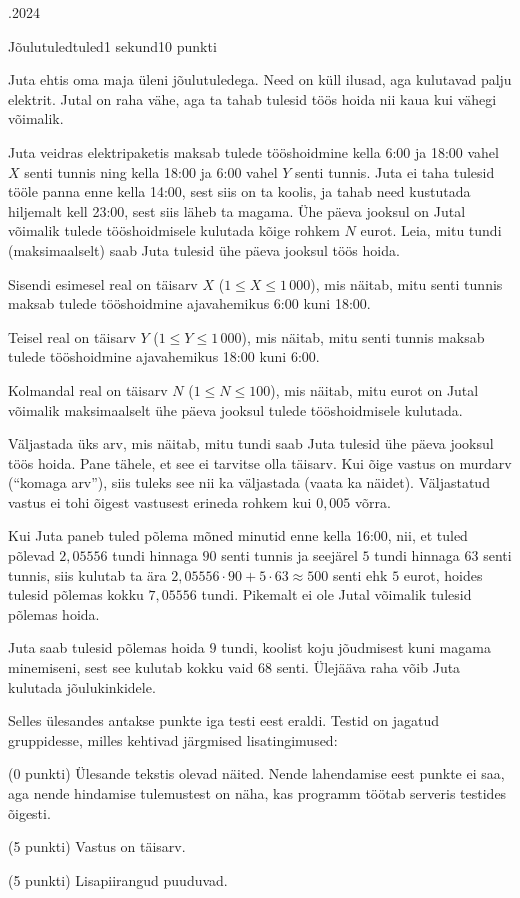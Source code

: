 \documentclass[a4paper,11pt]{article}
\begin{document}
\begin{ol}{\eio}{.2024}{\yle}{}
\begin{yl}{1}{Jõulutuled}{tuled}{1 sekund}{10 punkti}

Juta ehtis oma maja üleni jõulutuledega. Need on küll ilusad, aga kulutavad palju elektrit. Jutal on raha vähe, aga ta tahab tulesid töös hoida nii kaua kui vähegi võimalik.

Juta veidras elektripaketis maksab tulede tööshoidmine kella 6:00 ja 18:00 vahel $X$ senti tunnis ning kella 18:00 ja 6:00 vahel $Y$ senti tunnis. Juta ei taha tulesid tööle panna enne kella 14:00, sest siis on ta koolis, ja tahab need kustutada hiljemalt kell 23:00, sest siis läheb ta magama. Ühe päeva jooksul on Jutal võimalik tulede tööshoidmisele kulutada kõige rohkem $N$ eurot. Leia, mitu tundi (maksimaalselt) saab Juta tulesid ühe päeva jooksul töös hoida.

\sis
Sisendi esimesel real on täisarv $X$ ($1 \le X \le 1\,000$), mis näitab, mitu senti tunnis maksab tulede tööshoidmine ajavahemikus 6:00 kuni 18:00.

Teisel real on täisarv $Y$ ($1 \le Y \le 1\,000$), mis näitab, mitu senti tunnis maksab tulede tööshoidmine ajavahemikus 18:00 kuni 6:00.

Kolmandal real on täisarv $N$ ($1 \le N \le 100$), mis näitab, mitu eurot on Jutal võimalik maksimaalselt ühe päeva jooksul tulede tööshoidmisele kulutada.

\val
Väljastada üks arv, mis näitab, mitu tundi saab Juta tulesid ühe päeva jooksul töös hoida. Pane tähele, et see ei tarvitse olla täisarv. Kui õige vastus on murdarv (``komaga arv''), siis tuleks see nii ka väljastada (vaata ka näidet). Väljastatud vastus ei tohi õigest vastusest erineda rohkem kui $0,005$ võrra.

\nde[0]{3cm}{3cm}

Kui Juta paneb tuled põlema mõned minutid enne kella 16:00, nii, et tuled põlevad $2,05556$ tundi hinnaga $90$ senti tunnis ja seejärel $5$ tundi hinnaga $63$ senti tunnis, siis kulutab ta ära $2,05556 \cdot 90 + 5 \cdot 63 \approx 500$ senti ehk $5$ eurot, hoides tulesid põlemas kokku $7,05556$ tundi. Pikemalt ei ole Jutal võimalik tulesid põlemas hoida.

\nde[1]{3cm}{3cm}

Juta saab tulesid põlemas hoida $9$ tundi, koolist koju jõudmisest kuni magama minemiseni, sest see kulutab kokku vaid $68$ senti. Ülejääva raha võib Juta kulutada jõulukinkidele.

\hnd
Selles ülesandes antakse punkte iga testi eest eraldi. Testid on jagatud gruppidesse, milles kehtivad järgmised lisatingimused:
\begin{xenum}
	\item (0 punkti) Ülesande tekstis olevad näited. Nende lahendamise eest punkte ei saa, aga nende hindamise tulemustest on näha, kas programm töötab serveris testides õigesti.
	\item (5 punkti) Vastus on täisarv.
	\item (5 punkti) Lisapiirangud puuduvad.
\end{xenum}

\end{yl}
\end{ol}
\end{document}
